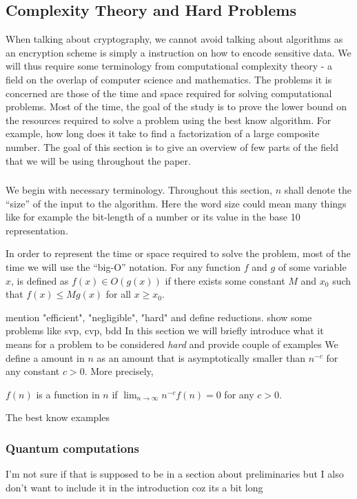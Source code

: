 \subsection{Complexity Theory and Hard Problems} \label{hardness}
When talking about cryptography, we cannot avoid talking about algorithms as an encryption scheme is simply a instruction on how to encode sensitive data. We will thus require some terminology from computational complexity theory - a field on the overlap of computer science and mathematics. The problems it is concerned are those of the time and space required for solving computational problems. Most of the time, the goal of the study is to prove the lower bound on the resources required to solve a problem using the best know algorithm. For example, how long does it take to find a factorization of a large composite number. The goal of this section is to give an overview of few parts of the field that we will be using throughout the paper. 

\subsubsection*{}
We begin with necessary terminology. Throughout this section, $n$ shall denote the ``size'' of the input to the algorithm. Here the word size could mean many things like for example the bit-length of a number or its value in the base 10 representation.

In order to represent the time or space required to solve the problem, most of the time we will use the ``big-O'' notation. For any function $f$ and $g$ of some variable $x$, is defined as $f(x) \in O(g(x))$ if there exists some constant $M$ and $x_0$ such that $f(x) \leq Mg(x)$ for all $x \geq x_0$.

mention "efficient", "negligible", "hard" and define reductions. show some problems like svp, cvp, bdd
In this section we will briefly introduce what it means for a problem to be considered \textit{hard} and provide couple of examples
We define a  amount in $n$ as an amount that is asymptotically smaller than $n^{-c}$ for any constant $c > 0$. More precisely, 
\begin{definition}\label{negl}
    $f (n)$ is a  function in $n$ if $\lim_{n \to \infty}n^{-c} f (n) = 0$ for any $c > 0$.
\end{definition}
The best know examples
\subsubsection*{Quantum computations}
I'm not sure if that is supposed to be in a section about preliminaries but I also don't want to include it in the introduction coz its a bit long


